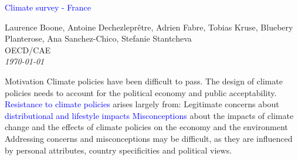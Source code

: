 



%
              





\begin{frame}
\thispagestyle{empty}
\begin{center}
\begin{LARGE}
\textcolor{blue}{Climate survey - France}
\end{LARGE}

\vspace{1cm}


Laurence Boone, Antoine Dechezleprêtre, Adrien Fabre, Tobias Kruse, Bluebery Planterose, Ana Sanchez-Chico, Stefanie Stantcheva \\

OECD/CAE \\

\textit{\today} 

\end{center}

\bigskip

\end{frame}

\begin{frame}{Motivation}
\bbs
\ip Climate policies have been difficult to pass.
\ip The design of climate policies needs to account for the political economy and public acceptability.
\ip \textcolor{blue}{Resistance to climate policies} arises largely from:
\bbs
\ip Legitimate concerns about \textcolor{blue}{distributional and lifestyle impacts}
\ip \textcolor{blue}{Misconceptions} about the impacts of climate change and the effects of climate policies on the economy and the environment
\ee 
\ip Addressing concerns and misconceptions may be difficult, as they are influenced by personal attributes, country specificities and political views.
\ee
\end{frame}

